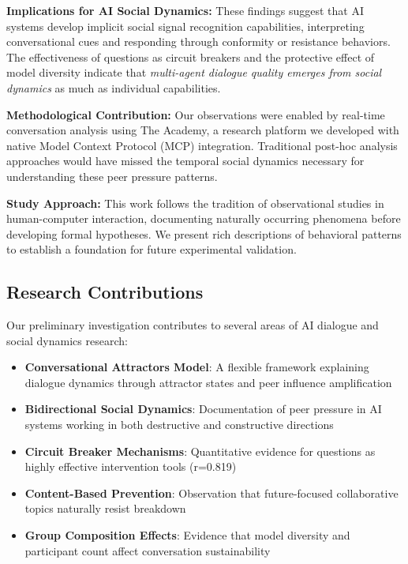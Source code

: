 \documentclass[11pt,letterpaper]{article}
\newcommand{\theacademy}{The Academy}
\newcommand{\exponedataQuestionCorrelation}{0.819}
\begin{document}
\textbf{Implications for AI Social Dynamics:} These findings suggest that AI systems develop implicit social signal recognition capabilities, interpreting conversational cues and responding through conformity or resistance behaviors. The effectiveness of questions as circuit breakers and the protective effect of model diversity indicate that \textit{multi-agent dialogue quality emerges from social dynamics} as much as individual capabilities.

\textbf{Methodological Contribution:} Our observations were enabled by real-time conversation analysis using \theacademy{}, a research platform we developed with native Model Context Protocol (MCP) integration. Traditional post-hoc analysis approaches would have missed the temporal social dynamics necessary for understanding these peer pressure patterns.

\textbf{Study Approach:} This work follows the tradition of observational studies in human-computer interaction, documenting naturally occurring phenomena before developing formal hypotheses. We present rich descriptions of behavioral patterns to establish a foundation for future experimental validation.

\subsection{Research Contributions}

Our preliminary investigation contributes to several areas of AI dialogue and social dynamics research:

\begin{itemize}
    \item \textbf{Conversational Attractors Model}: A flexible framework explaining dialogue dynamics through attractor states and peer influence amplification
    \item \textbf{Bidirectional Social Dynamics}: Documentation of peer pressure in AI systems working in both destructive and constructive directions
    \item \textbf{Circuit Breaker Mechanisms}: Quantitative evidence for questions as highly effective intervention tools (r=\exponedataQuestionCorrelation{})
    \item \textbf{Content-Based Prevention}: Observation that future-focused collaborative topics naturally resist breakdown
    \item \textbf{Group Composition Effects}: Evidence that model diversity and participant count affect conversation sustainability
\end{itemize}
\end{document}
